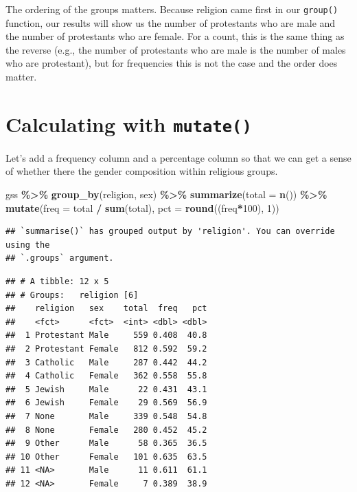 \documentclass[
]{book}
\newenvironment{Shaded}{\begin{snugshade}}{\end{snugshade}}
\newcommand{\AttributeTok}[1]{\textcolor[rgb]{0.13,0.29,0.53}{#1}}
\newcommand{\DecValTok}[1]{\textcolor[rgb]{0.00,0.00,0.81}{#1}}
\newcommand{\FunctionTok}[1]{\textcolor[rgb]{0.13,0.29,0.53}{\textbf{#1}}}
\newcommand{\NormalTok}[1]{#1}
\newcommand{\SpecialCharTok}[1]{\textcolor[rgb]{0.81,0.36,0.00}{\textbf{#1}}}
\begin{document}
The ordering of the groups matters. Because religion came first in our \texttt{group()} function, our results will show us the number of protestants who are male and the number of protestants who are female. For a count, this is the same thing as the reverse (e.g., the number of protestants who are male is the number of males who are protestant), but for frequencies this is not the case and the order does matter.

\hypertarget{calculating-with-mutate}{%
\section{\texorpdfstring{Calculating with \texttt{mutate()}}{Calculating with mutate()}}\label{calculating-with-mutate}}

Let's add a frequency column and a percentage column so that we can get a sense of whether there the gender composition within religious groups.

\begin{Shaded}
\begin{Highlighting}[]
\NormalTok{gss }\SpecialCharTok{\%\textgreater{}\%}
  \FunctionTok{group\_by}\NormalTok{(religion, sex) }\SpecialCharTok{\%\textgreater{}\%}
  \FunctionTok{summarize}\NormalTok{(}\AttributeTok{total =} \FunctionTok{n}\NormalTok{()) }\SpecialCharTok{\%\textgreater{}\%}
  \FunctionTok{mutate}\NormalTok{(}\AttributeTok{freq =}\NormalTok{ total }\SpecialCharTok{/} \FunctionTok{sum}\NormalTok{(total),}
         \AttributeTok{pct =} \FunctionTok{round}\NormalTok{((freq}\SpecialCharTok{*}\DecValTok{100}\NormalTok{), }\DecValTok{1}\NormalTok{))}
\end{Highlighting}
\end{Shaded}

\begin{verbatim}
## `summarise()` has grouped output by 'religion'. You can override using the
## `.groups` argument.
\end{verbatim}

\begin{verbatim}
## # A tibble: 12 x 5
## # Groups:   religion [6]
##    religion   sex    total  freq   pct
##    <fct>      <fct>  <int> <dbl> <dbl>
##  1 Protestant Male     559 0.408  40.8
##  2 Protestant Female   812 0.592  59.2
##  3 Catholic   Male     287 0.442  44.2
##  4 Catholic   Female   362 0.558  55.8
##  5 Jewish     Male      22 0.431  43.1
##  6 Jewish     Female    29 0.569  56.9
##  7 None       Male     339 0.548  54.8
##  8 None       Female   280 0.452  45.2
##  9 Other      Male      58 0.365  36.5
## 10 Other      Female   101 0.635  63.5
## 11 <NA>       Male      11 0.611  61.1
## 12 <NA>       Female     7 0.389  38.9
\end{verbatim}
\end{document}
